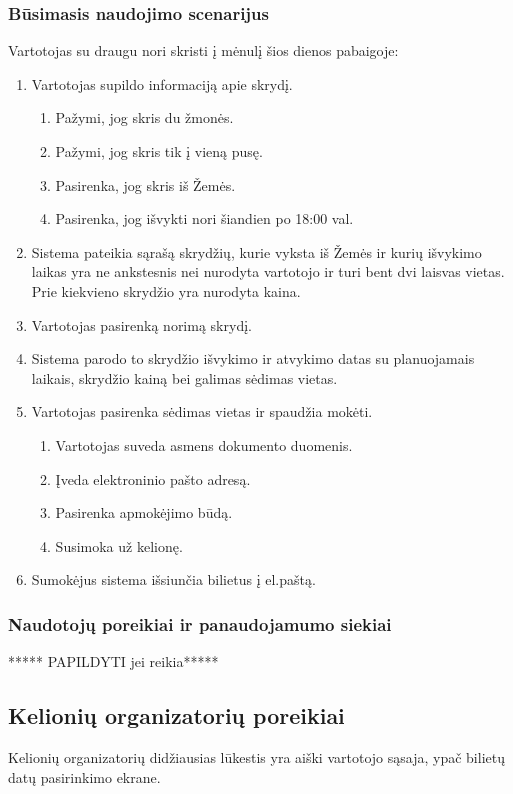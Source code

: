 \documentclass{VUMIFPSkursinis}
\begin{document}
\subsubsection{Būsimasis naudojimo scenarijus}
Vartotojas su draugu nori skristi į mėnulį šios dienos pabaigoje:
\begin{enumerate}
\item  Vartotojas supildo informaciją apie skrydį.
\begin{enumerate}[label*=\arabic*.]
\item Pažymi, jog skris du žmonės.
\item Pažymi, jog skris tik į vieną pusę.
\item Pasirenka, jog skris iš Žemės.
\item  Pasirenka, jog išvykti nori šiandien po 18:00 val.
\end{enumerate}
\item  Sistema pateikia sąrašą skrydžių, kurie vyksta iš Žemės ir kurių išvykimo laikas yra ne ankstesnis nei nurodyta vartotojo ir turi bent dvi laisvas vietas. Prie kiekvieno skrydžio yra nurodyta kaina.
\item Vartotojas pasirenką norimą skrydį.
\item Sistema parodo to skrydžio išvykimo ir atvykimo datas su planuojamais laikais, skrydžio kainą bei galimas sėdimas vietas.
\item Vartotojas pasirenka sėdimas vietas ir spaudžia mokėti.
\begin{enumerate}[label*=\arabic*.]
\item Vartotojas suveda asmens dokumento duomenis.
\item Įveda elektroninio pašto adresą.
\item Pasirenka apmokėjimo būdą.
\item  Susimoka už kelionę.
\end{enumerate}
\item   Sumokėjus sistema išsiunčia  bilietus į el.paštą.
\end{enumerate}

\subsubsection{Naudotojų poreikiai ir panaudojamumo siekiai}
\centerline{***** PAPILDYTI jei reikia*****}

\subsection{Kelionių organizatorių poreikiai}
Kelionių organizatorių didžiausias lūkestis yra aiški vartotojo sąsaja, ypač bilietų datų pasirinkimo ekrane.
\end{document}
